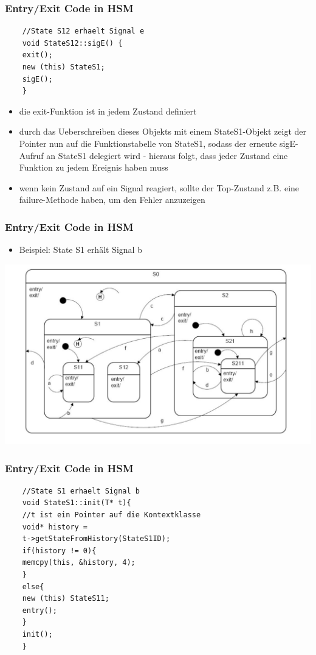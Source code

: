 \documentclass{beamer}
\begin{document}
\begin{frame}[fragile]
	\frametitle{Entry/Exit Code in HSM }
	\begin{lstlisting}
	//State S12 erhaelt Signal e
	void StateS12::sigE() {
	exit(); 
	new (this) StateS1;
	sigE();
	}
	\end{lstlisting}
	\begin{itemize}
		\item die exit-Funktion ist in jedem Zustand definiert
		\item durch das Ueberschreiben dieses Objekts mit einem StateS1-Objekt
		zeigt der Pointer nun auf die Funktionstabelle von StateS1,
		sodass der erneute sigE-Aufruf an StateS1 delegiert wird - hieraus folgt, dass jeder Zustand eine Funktion zu jedem Ereignis haben muss
		\item wenn kein Zustand auf ein Signal reagiert, sollte der Top-Zustand z.B. eine
		failure-Methode haben, um den Fehler anzuzeigen
	\end{itemize}
\end{frame}

\begin{frame}
	\frametitle{Entry/Exit Code in HSM  }
	\begin{itemize}
		\item Beispiel: State S1 erh\"alt Signal b
	\end{itemize}
	\includegraphics[scale=.3]{img/beispiel_automat}
\end{frame}

\begin{frame}[fragile]
	\frametitle{Entry/Exit Code in HSM }
	\begin{lstlisting}
	//State S1 erhaelt Signal b
	void StateS1::init(T* t){
	//t ist ein Pointer auf die Kontextklasse
	void* history = 
	t->getStateFromHistory(StateS1ID);
	if(history != 0){
	memcpy(this, &history, 4);
	}
	else{
	new (this) StateS11;
	entry();
	}
	init();
	}
	\end{lstlisting}
\end{frame}
\end{document}
